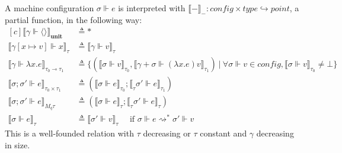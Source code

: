 \begin{definition}
  A machine configuration $\sigma \Vdash e$ is interpreted with $\llbracket -
  \rrbracket_{ - } : \textit{config} \times \textit{type} \hookrightarrow
  \textit{point}$, a partial function, in the following way:
  \begin{equation}
  \begin{aligned}[c]
  \llbracket \gamma \Vdash \langle \rangle \rrbracket_{\textbf{unit}}
  &\triangleq * \\
  \llbracket \gamma [x \mapsto v] \Vdash x \rrbracket_{\tau}
  &\triangleq \llbracket \gamma \Vdash v \rrbracket_{\tau} \\
  \llbracket \gamma \Vdash \lambda x . e \rrbracket_{\tau_0 \multimap \tau_1}
  &\triangleq \{ (\llbracket \sigma \Vdash v \rrbracket_{\tau_0}, \llbracket \gamma +
  \sigma \Vdash (\lambda x . e) v \rrbracket_{\tau_1}) \> | \> \forall \sigma \Vdash v
  \in \textit{config}, \llbracket \sigma \Vdash v \rrbracket_{\tau_0} \not= \bot \} \\
  \llbracket \sigma; \sigma' \Vdash e \rrbracket_{\tau_0 \times \tau_1} &\triangleq (\llbracket \sigma
  \Vdash e \rrbracket_{\tau_0}; \llbracket_{\tau} \sigma' \Vdash e \rrbracket_{\tau_1}) \\
  \llbracket \sigma; \sigma' \Vdash e \rrbracket_{M_q \tau} &\triangleq (\llbracket \sigma
  \Vdash e \rrbracket_{\tau}; \llbracket_{\tau} \sigma' \Vdash e \rrbracket_{\tau}) \\
  \llbracket \sigma \Vdash e \rrbracket_{\tau} &\triangleq \llbracket \sigma'
  \Vdash v\rrbracket_{\tau} \quad{\text{ if } \sigma \Vdash e
  \rightsquigarrow^* \sigma' \Vdash v}
  \end{aligned}
  \end{equation}
  This is a well-founded relation with $\tau$ decreasing or $\tau$ constant and
  $\gamma$ decreasing in size.
\end{definition}

